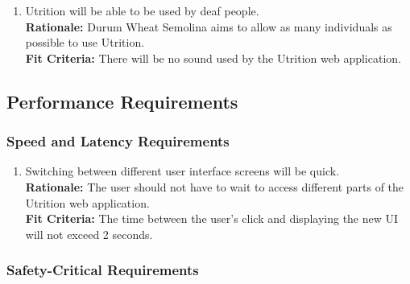 \documentclass[12pt]{article}
\begin{document}
\begin{enumerate}[{UH}6. ] 
	\item Utrition will be able to be used by deaf people.\\
	\textbf{Rationale:} Durum Wheat Semolina aims to allow as many individuals as possible to use Utrition.\\
	\textbf{Fit Criteria:} There will be no sound used by the Utrition web application. 
\end{enumerate}

\subsection{Performance Requirements}

\subsubsection{Speed and Latency Requirements}

\begin{enumerate}[start=1,label={PR\arabic*.}]
	\item Switching between different user interface screens will be quick.\\
	\textbf{Rationale:} The user should not have to wait to access different parts of the Utrition web application.\\
	\textbf{Fit Criteria:} The time between the user’s click and displaying the new UI will not exceed 2 seconds.
\end{enumerate}

\subsubsection{Safety-Critical Requirements}
\end{document}
